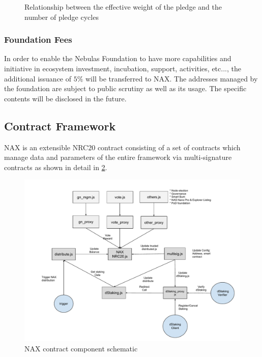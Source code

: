 \begin{figure}
\centering
    \caption{Relationship between the effective weight of the pledge and the number of pledge cycles}\label{weight}
\end{figure}

\subsubsection{Foundation Fees}
In order to enable the Nebulas Foundation to have more capabilities and initiative in ecosystem investment, incubation, support, activities, etc..., the additional issuance of $5\%$ will be transferred to NAX. The addresses managed by the foundation are subject to public scrutiny as well as its usage. The specific contents will be disclosed in the future.

\subsection{Contract Framework}
NAX is an extensible NRC20 contract consisting of a set of contracts which manage data and parameters of the entire framework via multi-signature contracts as shown in detail in \ref{fig:nax_framework}.

\begin{figure}[htbp]
  \centering
    \includegraphics[width=1\textwidth]{../common/nax.pdf}
    \caption{NAX contract component schematic \label{fig:nax_framework}}
\end{figure}
